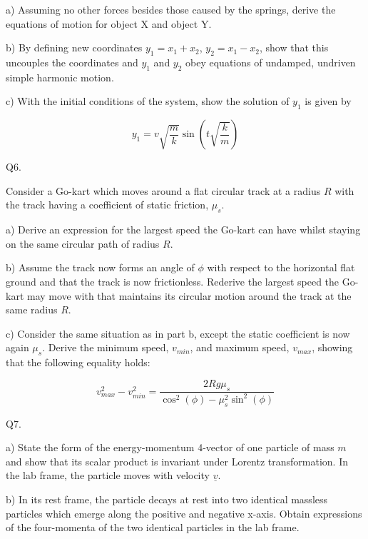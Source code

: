 \documentclass[a4paper,11pt]{article}
\begin{document}
\medskip

a) Assuming no other forces besides those caused by the springs, derive the equations of motion for object X and object Y. 

\medskip

b) By defining new coordinates \( y_{1} = x_{1} + x_{2} \), \( y_{2} = x_{1} - x_{2} \), show that this uncouples the coordinates and \( y_{1} \) and \( y_{2} \) obey equations of undamped, undriven simple harmonic motion. 

\medskip

c) With the initial conditions of the system, show the solution of \( y_{1} \) is given by 

\[
y_{1} = v \sqrt{\frac{m}{k}} \sin(t \sqrt{\frac{k}{m}})
\]

Q6. 

Consider a Go-kart which moves around a flat circular track at a radius \( R \) with the track having a coefficient of static friction, \( \mu_{s} \). 

\medskip

a) Derive an expression for the largest speed the Go-kart can have whilst staying on the same circular path of radius \( R \). 

\medskip

b) Assume the track now forms an angle of \( \phi \) with respect to the horizontal flat ground and that the track is now frictionless. Rederive the largest speed the Go-kart may move with that maintains its circular motion around the track at the same radius \( R \). 

\medskip

c) Consider the same situation as in part b, except the static coefficient is now again \( \mu_{s} \). Derive the minimum speed, \( v_{min} \), and maximum speed, \( v_{max} \), showing that the following equality holds:

\[ 
v_{max}^{2} - v_{min}^{2} = \frac{2Rg\mu_{s}}{\cos^{2}(\phi) - \mu_{s}^{2}\sin^{2}(\phi)}
\]

Q7. 

a) State the form of the energy-momentum 4-vector of one particle of mass \( m \) and show that its scalar product is invariant under Lorentz transformation. In the lab frame, the particle moves with velocity \( \underline{v} \). 

\medskip

b) In its rest frame, the particle decays at rest into two identical massless particles which emerge along the positive and negative x-axis. Obtain expressions of the four-momenta of the two identical particles in the lab frame. 
\end{document}
